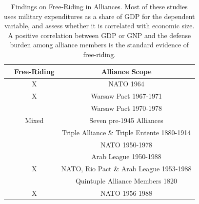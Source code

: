 \documentclass[12pt]{article}
\begin{document}
\begin{table}[hbt!]
\begin{tabular}{lcc}
  & Free-Riding & Alliance Scope \\
\hline
\citet{OlsonZeckhauser1966} & X  & NATO 1964 \\
\citet{Starr1974} & X & Warsaw Pact 1967-1971 \\
\citet{Reisinger1983} &  & Warsaw Pact 1970-1978 \\
\citet{Thies1987} & Mixed & Seven pre-1945 Alliances \\ 
\citet{ConybeareSandler1990} &  & Triple Alliance \& Triple Entente 1880-1914 \\
\citet{Palmer1990} &   & NATO 1950-1978 \\
\citet{Chenetal1996} &  & Arab League 1950-1988 \\
\citet{OnealWhatley1996} & X & NATO, Rio Pact \& Arab League 1953-1988 \\
\citet{Siroky2012} &  & Quintuple Alliance Members 1820 \\
\citet{PluemperNeumayer2015} & X & NATO 1956-1988 \\
\hline 
\end{tabular}
\caption{Findings on Free-Riding in Alliances. Most of these studies uses military expenditures as a share of GDP for the dependent variable, and assess whether it is correlated with economic size. A positive correlation between GDP or GNP and the defense burden among alliance members is the standard evidence of free-riding.}
\end{table}






  
% 
\end{document}
